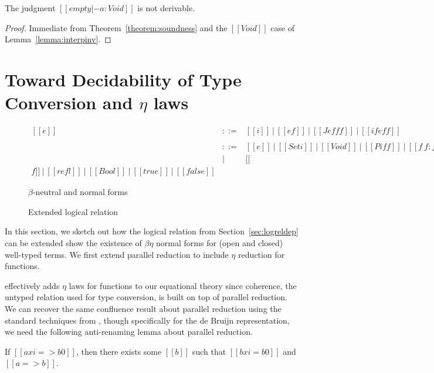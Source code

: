 \documentclass[acmsmall]{acmart}
\begin{document}
\begin{corollary}
  \label{corollary:consistency}
  The judgment $[[empty |- a : Void ]]$ is not derivable.
\end{corollary}
\begin{proof}
  Immediate from Theorem~\ref{theorem:soundness} and the $[[Void]]$ case of Lemma~\ref{lemma:interpinv}.
\end{proof}

\section{Toward Decidability of Type Conversion and $\eta$ laws}
\label{sec:extension}
\begin{figure}[h]
  \[
    \begin{array}{lcl}
      [[e]] & ::= & [[i]]\ |\ [[e f]]\ |\ [[J e f f f]]\ |\ [[if e f
                    f]] \\ \\
      [[f]] & ::= & [[e]]\ |\ [[Set i]]\ |\ [[Void]]\ |\ [[Pi f f]]\
                    |\ [[f ~ f : f]]\\
            & |   & [[\\ f]]\ |\ [[refl]]\ |\ [[Bool]]\ |\ [[true]]\ |\ [[false]]
    \end{array}
  \]
  \caption{$\beta$-neutral and normal forms}
  \label{fig:nenf}
\end{figure}
\begin{figure}[h]
  \caption{Extended logical relation}
  \label{fig:logrelopen}
\end{figure}

In this section, we sketch out how the logical relation from
Section~\ref{sec:logreldep} can be extended show the existence of
$\beta\eta$ normal forms for (open and closed) well-typed terms. We
first extend parallel reduction to include $\eta$ reduction for
functions.
\begin{center}
\end{center}
 effectively adds $\eta$ laws for functions to our
equational theory since coherence, the untyped relation used for type
conversion, is built on top of parallel reduction. We can recover the
same confluence result about parallel reduction using the standard
techniques from \citet{barendregt:lambda-calculi-with-types,
takahashi-parallel-reduction}, though specifically for the de Bruijn
representation, we need the following anti-renaming lemma about
parallel reduction.
\begin{lemma}
  \label{lemma:parantirenaming} If $[[a { xi } => b0]]$, then there
exists some $[[b]]$ such that $[[b { xi } = b0]]$ and $[[a => b]]$.
\end{lemma}
\end{document}
